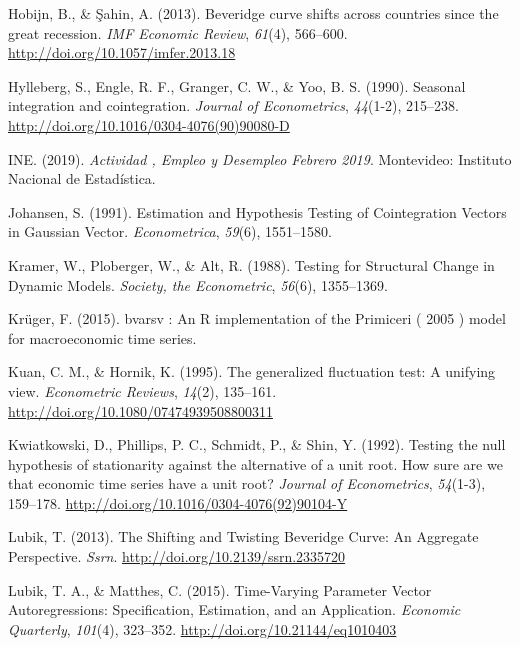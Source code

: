 \documentclass[12pt,oneside]{reedthesis}
\begin{document}
\leavevmode\hypertarget{ref-Hobijn2013}{}%
Hobijn, B., \& Şahin, A. (2013). Beveridge curve shifts across countries since the great recession. \emph{IMF Economic Review}, \emph{61}(4), 566--600. \url{http://doi.org/10.1057/imfer.2013.18}

\leavevmode\hypertarget{ref-hegy1990}{}%
Hylleberg, S., Engle, R. F., Granger, C. W., \& Yoo, B. S. (1990). Seasonal integration and cointegration. \emph{Journal of Econometrics}, \emph{44}(1-2), 215--238. \url{http://doi.org/10.1016/0304-4076(90)90080-D}

\leavevmode\hypertarget{ref-INE2019}{}%
INE. (2019). \emph{Actividad , Empleo y Desempleo Febrero 2019}. Montevideo: Instituto Nacional de Estadística.

\leavevmode\hypertarget{ref-Johansen1991}{}%
Johansen, S. (1991). Estimation and Hypothesis Testing of Cointegration Vectors in Gaussian Vector. \emph{Econometrica}, \emph{59}(6), 1551--1580.

\leavevmode\hypertarget{ref-Society1988}{}%
Kramer, W., Ploberger, W., \& Alt, R. (1988). Testing for Structural Change in Dynamic Models. \emph{Society, the Econometric}, \emph{56}(6), 1355--1369.

\leavevmode\hypertarget{ref-Kruger2015}{}%
Krüger, F. (2015). bvarsv : An R implementation of the Primiceri ( 2005 ) model for macroeconomic time series.

\leavevmode\hypertarget{ref-Kuan1995}{}%
Kuan, C. M., \& Hornik, K. (1995). The generalized fluctuation test: A unifying view. \emph{Econometric Reviews}, \emph{14}(2), 135--161. \url{http://doi.org/10.1080/07474939508800311}

\leavevmode\hypertarget{ref-KPSS1992}{}%
Kwiatkowski, D., Phillips, P. C., Schmidt, P., \& Shin, Y. (1992). Testing the null hypothesis of stationarity against the alternative of a unit root. How sure are we that economic time series have a unit root? \emph{Journal of Econometrics}, \emph{54}(1-3), 159--178. \url{http://doi.org/10.1016/0304-4076(92)90104-Y}

\leavevmode\hypertarget{ref-Lubik2013}{}%
Lubik, T. (2013). The Shifting and Twisting Beveridge Curve: An Aggregate Perspective. \emph{Ssrn}. \url{http://doi.org/10.2139/ssrn.2335720}

\leavevmode\hypertarget{ref-Lubik2016b}{}%
Lubik, T. A., \& Matthes, C. (2015). Time-Varying Parameter Vector Autoregressions: Specification, Estimation, and an Application. \emph{Economic Quarterly}, \emph{101}(4), 323--352. \url{http://doi.org/10.21144/eq1010403}
\end{document}
